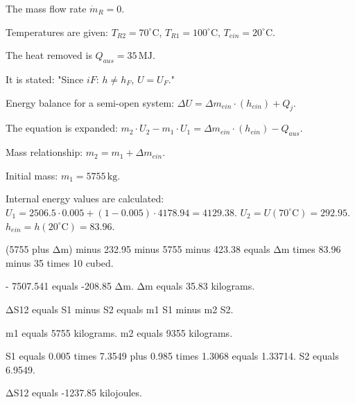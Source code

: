 The mass flow rate \( \dot{m}_{R} = 0 \).  

Temperatures are given:  
\( T_{R2} = 70^\circ \text{C} \), \( T_{R1} = 100^\circ \text{C} \), \( T_{ein} = 20^\circ \text{C} \).  

The heat removed is \( Q_{aus} = 35 \, \text{MJ} \).  

It is stated:  
"Since \( iF \): \( h \neq h_F \), \( U = U_F \)."  

Energy balance for a semi-open system:  
\( \Delta U = \Delta m_{ein} \cdot (h_{ein}) + Q_{j} \).  

The equation is expanded:  
\( m_2 \cdot U_2 - m_1 \cdot U_1 = \Delta m_{ein} \cdot (h_{ein}) - Q_{aus} \).  

Mass relationship:  
\( m_2 = m_1 + \Delta m_{ein} \).  

Initial mass:  
\( m_1 = 5755 \, \text{kg} \).  

Internal energy values are calculated:  
\( U_1 = 2506.5 \cdot 0.005 + (1 - 0.005) \cdot 4178.94 = 4129.38 \).  
\( U_2 = U(70^\circ \text{C}) = 292.95 \).  
\( h_{ein} = h(20^\circ \text{C}) = 83.96 \).

(5755 plus Δm) minus 232.95 minus 5755 minus 423.38 equals Δm times 83.96 minus 35 times 10 cubed.  

- 7507.541 equals -208.85 Δm.  
Δm equals 35.83 kilograms.  

ΔS12 equals S1 minus S2 equals m1 S1 minus m2 S2.  

m1 equals 5755 kilograms.  
m2 equals 9355 kilograms.  

S1 equals 0.005 times 7.3549 plus 0.985 times 1.3068 equals 1.33714.  
S2 equals 6.9549.  

ΔS12 equals -1237.85 kilojoules.